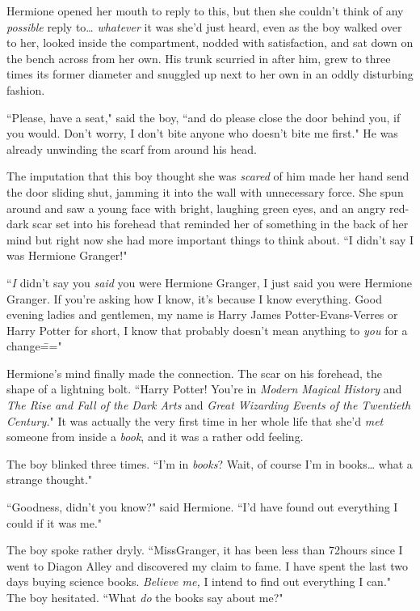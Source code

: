 Hermione opened her mouth to reply to this, but then she couldn't think of any \emph{possible} reply to{\ldots} \emph{whatever} it was she'd just heard, even as the boy walked over to her, looked inside the compartment, nodded with satisfaction, and sat down on the bench across from her own. His trunk scurried in after him, grew to three times its former diameter and snuggled up next to her own in an oddly disturbing fashion.

``Please, have a seat," said the boy, ``and do please close the door behind you, if you would. Don't worry, I don't bite anyone who doesn't bite me first." He was already unwinding the scarf from around his head.

The imputation that this boy thought she was \emph{scared} of him made her hand send the door sliding shut, jamming it into the wall with unnecessary force. She spun around and saw a young face with bright, laughing green eyes, and an angry red-dark scar set into his forehead that reminded her of something in the back of her mind but right now she had more important things to think about. ``I didn't say I was Hermione Granger!"

``\emph{I} didn't say you \emph{said} you were Hermione Granger, I just said you were Hermione Granger. If you're asking how I know, it's because I know everything. Good evening ladies and gentlemen, my name is Harry James Potter-Evans-Verres or Harry Potter for short, I know that probably doesn't mean anything to \emph{you} for a change\==="

Hermione's mind finally made the connection. The scar on his forehead, the shape of a lightning bolt. ``Harry Potter! You're in \emph{Modern Magical History} and \emph{The Rise and Fall of the Dark Arts} and \emph{Great Wizarding Events of the Twentieth Century.}" It was actually the very first time in her whole life that she'd \emph{met} someone from inside a \emph{book}, and it was a rather odd feeling.

The boy blinked three times. ``I'm in \emph{books}? Wait, of course I'm in books{\ldots} what a strange thought."

``Goodness, didn't you know?" said Hermione. ``I'd have found out everything I could if it was me."

The boy spoke rather dryly. ``Miss\?Granger, it has been less than 72\?hours since I went to Diagon Alley and discovered my claim to fame. I have spent the last two days buying science books. \emph{Believe me,} I intend to find out everything I can." The boy hesitated. ``What \emph{do} the books say about me?"


